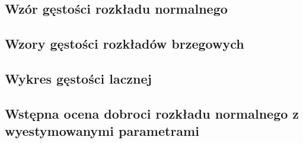 \documentclass[a4paper,11pt]{article}
\begin{document}
\subsection{Wzór gęstości rozkładu normalnego}

\subsection{Wzory gęstości rozkładów brzegowych}

\subsection{Wykres gęstości lacznej}

\subsection{Wstępna ocena dobroci rozkładu normalnego z wyestymowanymi parametrami}
\end{document}
